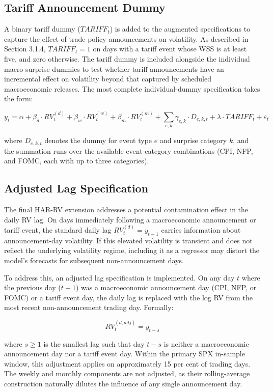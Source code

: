 \documentclass[12pt,a4paper]{report}
\begin{document}
\subsection{Tariff Announcement Dummy}
A binary tariff dummy ($TARIFF_t$) is added to the augmented specifications to capture the effect of trade policy announcements on volatility. As described in Section 3.1.4, $TARIFF_t = 1$ on days with a tariff event whose WSS is at least five, and zero otherwise. The tariff dummy is included alongside the individual macro surprise dummies to test whether tariff announcements have an incremental effect on volatility beyond that captured by scheduled macroeconomic releases. The most complete individual-dummy specification takes the form:

\begin{equation}
y_t = \alpha + \beta_d \cdot RV_t^{(d)} + \beta_w \cdot RV_t^{(w)} + \beta_m \cdot RV_t^{(m)} + \sum_{e,k} \gamma_{e,k} \cdot D_{e,k,t} + \lambda \cdot TARIFF_t + \varepsilon_t
\end{equation}

\noindent where $D_{e,k,t}$ denotes the dummy for event type $e$ and surprise category $k$, and the summation runs over the available event-category combinations (CPI, NFP, and FOMC, each with up to three categories).

\subsection{Adjusted Lag Specification}
The final HAR-RV extension addresses a potential contamination effect in the daily RV lag. On days immediately following a macroeconomic announcement or tariff event, the standard daily lag $RV_t^{(d)} = y_{t-1}$ carries information about announcement-day volatility. If this elevated volatility is transient and does not reflect the underlying volatility regime, including it as a regressor may distort the model's forecasts for subsequent non-announcement days.

To address this, an adjusted lag specification is implemented. On any day $t$ where the previous day ($t-1$) was a macroeconomic announcement day (CPI, NFP, or FOMC) or a tariff event day, the daily lag is replaced with the log RV from the most recent non-announcement trading day. Formally:

\begin{equation}
RV_t^{(d,adj)} = y_{t-s}
\end{equation}

\noindent where $s \geq 1$ is the smallest lag such that day $t-s$ is neither a macroeconomic announcement day nor a tariff event day. Within the primary SPX in-sample window, this adjustment applies on approximately 15 per cent of trading days. The weekly and monthly components are not adjusted, as their rolling-average construction naturally dilutes the influence of any single announcement day.
\end{document}
